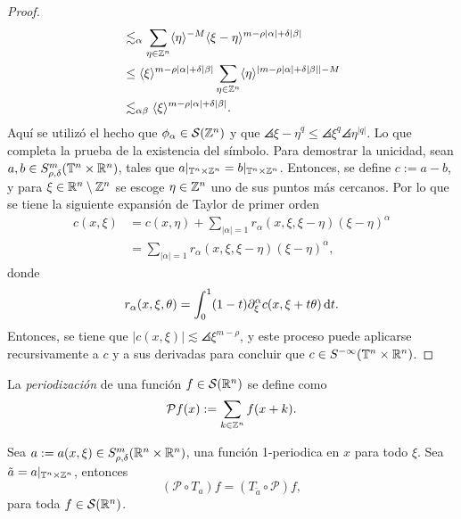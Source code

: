 \begin{proof}
\begin{align*}
		& \lesssim_{\alpha} \sum_{\eta\in\mathbb{Z}^n} \langle\eta\rangle^{-M}  \langle\xi-\eta\rangle^{m-\rho|\alpha|+\delta|\beta|}  \\
		& \leq \langle\xi\rangle^{m-\rho|\alpha|+\delta|\beta|} \sum_{\eta\in\mathbb{Z}^n} \langle\eta\rangle^{|m-\rho|\alpha|+\delta|\beta|| - M} \\
		& \lesssim_{\alpha\beta} \langle\xi\rangle^{m-\rho|\alpha|+\delta|\beta|}.
	\end{align*}
	Aquí se utilizó el hecho que $\phi_\alpha\in\mathcal{S}(\mathbb{Z}^n)$ y que $\angles{\xi-\eta}^q \leq \angles{\xi}^q \angles{\eta}^{|q|}$. Lo que completa la prueba de la existencia del símbolo. Para demostrar la unicidad, sean $a,b\in S^m_{\rho,\delta}(\mathbb{T}^n\times\mathbb{R}^n)$, tales que $a|_{\mathbb{T}^n\times\mathbb{Z}^n} = b|_{\mathbb{T}^n\times\mathbb{Z}^n}$. Entonces, se define $c:=a-b$, y para $\xi\in\mathbb{R}^n\setminus\mathbb{Z}^n$ se escoge $\eta\in\mathbb{Z}^n$ uno de sus puntos más cercanos. Por lo que se tiene la siguiente expansión de Taylor de primer orden
	\begin{align*}
		c(x, \xi) & = c(x, \eta) + \sum_{|\alpha|=1} r_\alpha(x, \xi, \xi-\eta)(\xi-\eta)^\alpha \\
		& = \sum_{|\alpha|=1} r_\alpha(x, \xi, \xi-\eta)(\xi-\eta)^\alpha,
	\end{align*}
	donde
	\begin{equation*}
		r_\alpha(x, \xi, \theta) = \int_0^1(1-t)\partial^\alpha_\xi c(x, \xi+t\theta)\mathop{}\!\mathrm{d} t.
	\end{equation*}
	Entonces, se tiene que $|c(x, \xi)| \lesssim \angles{\xi}^{m-\rho}$, y este proceso puede aplicarse recursivamente a $c$ y a sus derivadas para concluir que $c\in S^{-\infty}(\mathbb{T}^n\times\mathbb{R}^n)$.
\end{proof}
\begin{definition}[Periodización]
	La \textit{periodización} de una función $f\in\mathcal{S}(\mathbb{R}^n)$ se define como
	\begin{equation*}
		\mathcal{P}f(x):= \sum_{k\in\mathbb{Z}^n} f(x + k).
	\end{equation*}
\end{definition}
\begin{theorem}
	Sea $a:=a(x, \xi)\in S^m_{\rho, \delta}(\mathbb{R}^n\times\mathbb{R}^n)$, una función 1-periodica en $x$ para todo $\xi$. Sea $\tilde{a}=a|_{\mathbb{T}^n\times\mathbb{Z}^n}$, entonces 
	\begin{equation*}
		(\mathcal{P}\circ T_a) f = (T_{\tilde{a}}\circ \mathcal{P})f,
	\end{equation*}
	para toda $f\in\mathcal{S}(\mathbb{R}^n)$.
\end{theorem}
